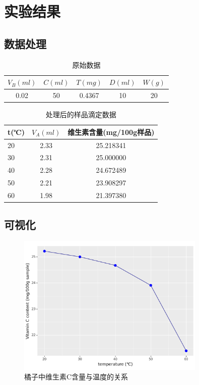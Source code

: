\documentclass[12pt,hyperref,a4paper,UTF8]{ctexart}
\begin{document}
\section{实验结果}
\subsection{数据处理}
\begin{table}[H]
	\centering
	\begin{tabular}{ccccc}
		\toprule
		$V_B(ml)$&    $C(ml)$ &      $T(mg)$ & $D(ml)$ &$W(g)$ \\
		\midrule
		0.02 & 50 & 0.4367 & 10 & 20 \\
		\bottomrule
	\end{tabular}
	\caption{原始数据}
\end{table}
\begin{table}[H]
	\centering
	\begin{tabular}{lcc}
		\toprule
		  t(℃)&    $V_A(ml)$ &      维生素含量(mg/100g样品) \\
		\midrule
		 20 &  2.33 &  25.218341 \\
		 30 &  2.31 &  25.000000 \\
		 40 &  2.28 &  24.672489 \\
		 50 &  2.21 &  23.908297 \\
		 60 &  1.98 &  21.397380 \\
		\bottomrule
	\end{tabular}
	\caption{处理后的样品滴定数据}
\end{table}
\subsection{可视化}
\begin{figure}[H]
	\centering
	\includegraphics[width=0.8\textwidth]{figures/res.png}
	\caption{橘子中维生素C含量与温度的关系}
	\label{fig:your_image}
\end{figure}
\end{document}
